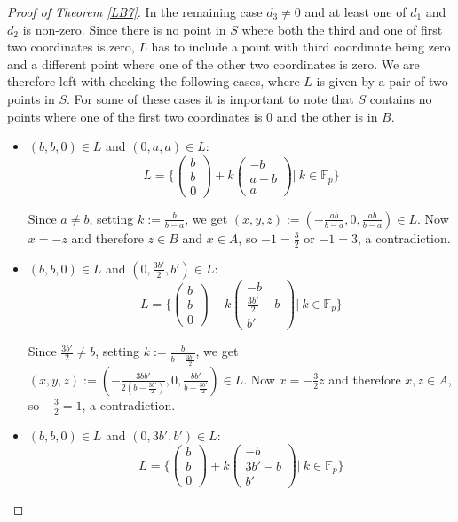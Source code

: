 \documentclass[12pt]{amsart}
\newcommand{\<}{\langle}
\renewcommand{\>}{\rangle}
\numberwithin{equation}{section}
\numberwithin{theorem}{section}
\begin{document}
\begin{proof}[Proof of Theorem \ref{LB7}]
In the remaining case $d_3\neq 0$ and at least one of $d_1$ and $d_2$ is non-zero. Since there is no point in $S$ where both the third and one of first two coordinates is zero, $L$ has to include a point with third coordinate being zero and a different point where one of the other two coordinates is zero. We are therefore left with checking the following cases, where $L$ is given by a pair of two points in $S$. For some of these cases it is important to note that $S$ contains no points where one of the first two coordinates is $0$ and the other is in $B$.

\begin{itemize}
    \item $(b,b,0)\in L$ and $(0,a,a)\in L$: $$L=\bigg\{\begin{pmatrix}
b\\
b\\
0
\end{pmatrix}+k\begin{pmatrix}
-b\\
a-b\\
a
\end{pmatrix}\bigg|\ k\in\mathbb{F}_p\bigg\}$$ 


Since $a\neq b$, setting $k:=\frac{b}{b-a}$, we get $(x,y,z):=(-\frac{ab}{b-a},0,\frac{ab}{b-a})\in L$. Now $x=-z$ and therefore $z\in B$ and $x\in A$, so $-1=\frac{3}{2}$ or $-1=3$, a contradiction.


    \item $(b,b,0)\in L$ and $(0,\frac{3b'}{2},b')\in L$: $$L=\bigg\{\begin{pmatrix}
b\\
b\\
0
\end{pmatrix}+k\begin{pmatrix}
-b\\
\frac{3b'}{2}-b\\
b'
\end{pmatrix}\bigg|\ k\in\mathbb{F}_p\bigg\}$$ 


Since $\frac{3b'}{2}\neq b$, setting $k:=\frac{b}{b-\frac{3b'}{2}}$, we get $(x,y,z):=(-\frac{3bb'}{2(b-\frac{3b'}{2})},0,\frac{bb'}{b-\frac{3b'}{2}})\in L$. Now $x=-\frac{3}{2}z$ and therefore $x,z\in A$, so $-\frac{3}{2}=1$, a contradiction.


    \item $(b,b,0)\in L$ and $(0,3b',b')\in L$: $$L=\bigg\{\begin{pmatrix}
b\\
b\\
0
\end{pmatrix}+k\begin{pmatrix}
-b\\
3b'-b\\
b'
\end{pmatrix}\bigg|\ k\in\mathbb{F}_p\bigg\}$$ 



\end{itemize}
\end{proof}
\end{document}
